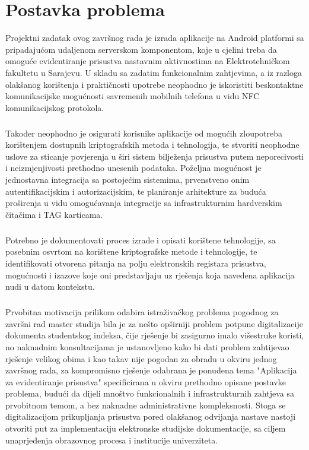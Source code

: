 \chapter{Postavka problema} \label{chapter:problem}
Projektni zadatak ovog završnog rada je izrada aplikacije na Android platformi sa pripadajućom udaljenom serverskom komponentom, koje u cjelini treba da omoguće evidentiranje prisustva nastavnim aktivnostima na Elektrotehničkom fakultetu u Sarajevu. U skladu sa zadatim funkcionalnim zahtjevima, a iz razloga olakšanog korištenja i praktičnosti upotrebe neophodno je iskoristiti beskontaktne komunikacijske mogućnosti savremenih mobilnih telefona u vidu NFC komunikacijskog protokola.

\paragraph*{}
Također neophodno je osigurati korisnike aplikacije od mogućih zloupotreba korištenjem dostupnih kriptografskih metoda i tehnologija, te stvoriti neophodne uslove za sticanje povjerenja u širi sistem bilježenja prisustva putem neporecivosti i neizmjenjivosti prethodno unesenih podataka. Poželjna mogućnost je jednostavna integracija sa postojećim sistemima, prvenstveno onim autentifikacijskim i autorizacijskim, te planiranje arhitekture za buduća proširenja u vidu omogućavanja integracije sa infrastrukturnim hardverskim čitačima i TAG karticama.

\paragraph*{}
Potrebno je dokumentovati proces izrade i opisati korištene tehnologije, sa posebnim osvrtom na korištene kriptografske metode i tehnologije, te identifikovati otvorena pitanja na polju elektronskih registara prisustva, mogućnosti i izazove koje oni predstavljaju uz rješenja koja navedena aplikacija nudi u datom kontekstu.

\paragraph*{}
Prvobitna motivacija prilikom odabira istraživačkog problema pogodnog za završni rad master studija bila je za nešto opširniji problem potpune digitalizacije dokumenta studentskog indeksa, čije rješenje bi zasigurno imalo višestruke koristi, no naknadnim konsultacijama je ustanovljeno kako bi dati problem zahtijevao rješenje velikog obima i kao takav nije pogodan za obradu u okviru jednog završnog rada, za kompromisno rješenje odabrana je ponuđena tema "Aplikacija za evidentiranje prisustva" specificirana u okviru prethodno opisane postavke problema, budući da dijeli mnoštvo funkcionalnih i infrastrukturnih zahtjeva sa prvobitnom temom, a bez naknadne administrativne kompleksnosti. Stoga se digitalizacijom prikupljanja prisustva pored olakšanog odvijanja nastave nastoji otvoriti put za implementaciju elektronske studijske dokumentacije, sa ciljem unaprjeđenja obrazovnog procesa i institucije univerziteta.